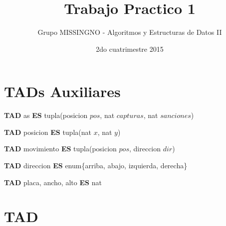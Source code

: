 \documentclass[10pt, a4paper]{article}
\author{Grupo MISSINGNO - Algoritmos y Estructuras de Datos II}
\date{2do cuatrimestre 2015}
\title{Trabajo Practico 1}
\begin{document}
\thispagestyle{empty}

\maketitle
\tableofcontents

\newpage

\section{TADs Auxiliares}
\par \textbf{TAD} as \textbf{ES} tupla(posicion $pos$, nat $capturas$, nat $sanciones$)
\par \textbf{TAD} posicion \textbf{ES} tupla(nat $x$, nat $y$)
\par \textbf{TAD} movimiento \textbf{ES} tupla(posicion $pos$, direccion $dir$)
\par \textbf{TAD} direccion \textbf{ES} enum\{arriba, abajo, izquierda, derecha\}
\par \textbf{TAD} placa, ancho, alto \textbf{ES} nat

\section{TAD }
\end{document}
